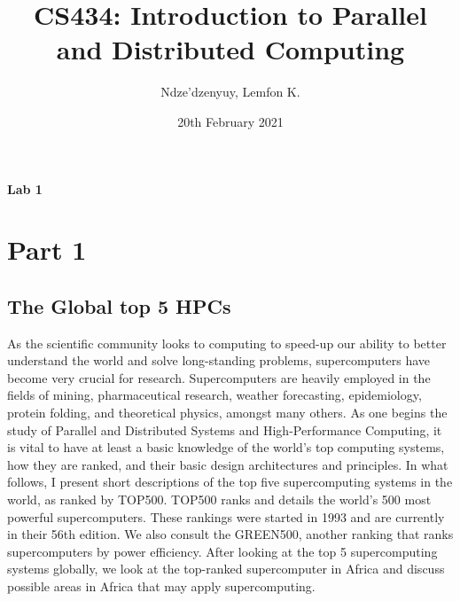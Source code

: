 \documentclass{article}
\title{\textbf{CS434: Introduction to Parallel and Distributed Computing}}
\author{Ndze'dzenyuy, Lemfon K.}
\date{20th February 2021}
\begin{document}
\maketitle

\begin{center}  
\begin{large}  
\textbf{ Lab 1\\}
\end{large} 
\end{center} 


\newpage




\section{Part 1}
\subsection{The Global top 5 HPCs}
As the scientific community looks to computing to speed-up our ability to better understand the world and solve long-standing problems, supercomputers have become very crucial for research. Supercomputers are heavily employed in the fields of mining, pharmaceutical research, weather forecasting, epidemiology, protein folding, and theoretical physics, amongst many others. As one begins the study of Parallel and Distributed Systems and High-Performance Computing, it is vital to have at least a basic knowledge of the world's top computing systems, how they are ranked, and their basic design architectures and principles. In what follows, I present short descriptions of the top five supercomputing systems in the world, as ranked by TOP500. TOP500 ranks and details the world's 500 most powerful supercomputers. These rankings were started in 1993 and are currently in their 56th edition. We also consult the GREEN500, another ranking that ranks supercomputers by power efficiency. After looking at the top 5 supercomputing systems globally, we look at the top-ranked supercomputer in Africa and discuss possible areas in Africa that may apply supercomputing.  
\end{document}

